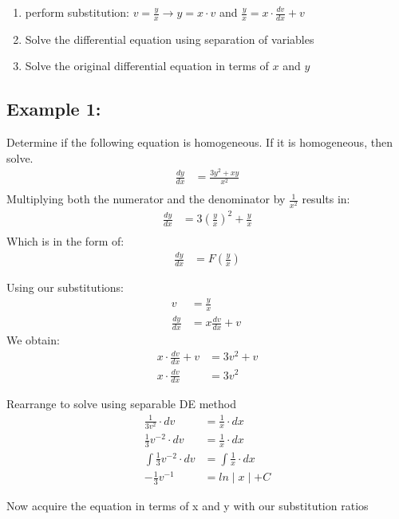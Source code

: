 \documentclass{article}
\begin{document}
\begin{flushleft}
{\begin{enumerate}
\item perform substitution: $ v = \frac{y}{x} \rightarrow y = x \cdot v$ and $\frac{y}{x} = x \cdot \frac{dv}{dx} + v $
\item Solve the differential equation using separation of variables
\item Solve the original differential equation in terms of $x$ and $y$
\end{enumerate}
\bigskip
\subsection*{\textbf{Example 1:}}
Determine if the following equation is homogeneous. If it is homogeneous, then solve.
\begin{align*}
\frac{dy}{dx} & = \frac{3y^2 +xy}{x^2}\\
\end{align*}
Multiplying both the numerator and the denominator by $\frac{1}{x^2}$ results in:
\begin{align*}
\frac{dy}{dx} & = 3(\frac{y}{x})^2+\frac{y}{x}\\
\end{align*}
Which is in the form of:
\begin{align*}
\frac{dy}{dx} & = F (\frac{y}{x})
\end{align*}

Using our substitutions:
\begin{align*}
v & = \frac{y}{x}\\
\frac{dy}{dx} & = x \frac{dv}{dx} + v\
 \end{align*}
We obtain:
\begin{align*}
x \cdot \frac{dv}{dx} + v & = 3v^2 + v\\
x \cdot  \frac{dv}{dx}  & = 3v^2 
\end{align*}

Rearrange to solve using separable DE method
\begin{align*}
\frac{1}{3v^2} \cdot dv & = \frac{1}{x} \cdot dx \\
\frac{1}{3} v^{-2} \cdot dv & = \frac{1}{x} \cdot dx \\
\int \frac{1}{3} v^{-2} \cdot dv & = \int \frac{1}{x} \cdot dx  \\
-\frac{1}{3}v^{-1} & = ln\mid x \mid + C
\end{align*}

Now acquire the equation in terms of x and y with our substitution ratios

}
\end{flushleft}
\end{document}
